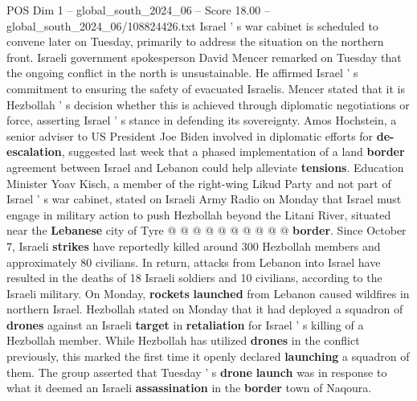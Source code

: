 \begin{textsample}{POS Dim 1 – global\_south\_2024\_06 – Score 18.00 – global\_south\_2024\_06/108824426.txt}
Israel ' s war cabinet is scheduled to convene later on Tuesday, primarily to address the situation on the northern front.
Israeli government spokesperson David Mencer remarked on Tuesday that the ongoing conflict in the north is unsustainable.
He affirmed Israel ' s commitment to ensuring the safety of evacuated Israelis.
Mencer stated that it is Hezbollah ' s decision whether this is achieved through diplomatic negotiations or force, asserting Israel ' s stance in defending its sovereignty.
Amos Hochstein, a senior adviser to US President Joe Biden involved in diplomatic efforts for \textbf{de-escalation}, suggested last week that a phased implementation of a land \textbf{border} agreement between Israel and Lebanon could help alleviate \textbf{tensions}.
Education Minister Yoav Kisch, a member of the right-wing Likud Party and not part of Israel ' s war cabinet, stated on Israeli Army Radio on Monday that Israel must engage in military action to push Hezbollah beyond the Litani River, situated near the \textbf{Lebanese} city of Tyre @ @ @ @ @ @ @ @ @ @ \textbf{border}.
Since October 7, Israeli \textbf{strikes} have reportedly killed around 300 Hezbollah members and approximately 80 civilians.
In return, attacks from Lebanon into Israel have resulted in the deaths of 18 Israeli soldiers and 10 civilians, according to the Israeli military.
On Monday, \textbf{rockets} \textbf{launched} from Lebanon caused wildfires in northern Israel.
Hezbollah stated on Monday that it had deployed a squadron of \textbf{drones} against an Israeli \textbf{target} in \textbf{retaliation} for Israel ' s killing of a Hezbollah member.
While Hezbollah has utilized \textbf{drones} in the conflict previously, this marked the first time it openly declared \textbf{launching} a squadron of them.
The group asserted that Tuesday ' s \textbf{drone} \textbf{launch} was in response to what it deemed an Israeli \textbf{assassination} in the \textbf{border} town of Naqoura.

\end{textsample}
